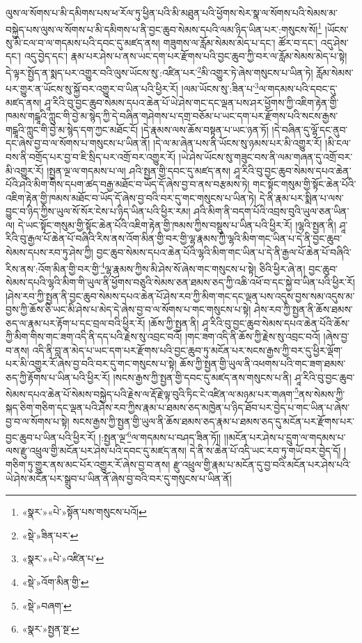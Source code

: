 ལུས་ལ་སོགས་པ་མི་དམིགས་པས་ཕ་རོལ་ཏུ་ཕྱིན་པའི་མི་མཐུན་པའི་ཕྱོགས་སེར་སྣ་ལ་སོགས་པའི་སེམས་མ་བསྐྱེད་པས་ལུས་ལ་སོགས་པ་མི་དམིགས་པ་ནི་བྱང་ཆུབ་སེམས་དཔའི་ལམ་ཉིད་ཡིན་པར་:གསུངས་སོ།\footnote{«སྣར་»«པེ་»སྟོན་པས་གསུངས་པའོ།} །ཡོངས་སུ་མི་ངལ་བ་ལ་གདམས་པའི་དབང་དུ་མཛད་ནས། གཟུགས་ལ་རློམ་སེམས་མེད་པ་དང་། ཚོར་བ་དང་། འདུ་ཤེས་དང་། འདུ་བྱེད་དང་། རྣམ་པར་ཤེས་པ་ནས་ཡང་དག་པར་རྫོགས་པའི་བྱང་ཆུབ་ཀྱི་བར་ལ་རློམ་སེམས་མེད་པ་སྟེ། དེ་ལྟར་སྤྱོད་ན་སྨད་པར་འགྱུར་བའི་ལུས་ཡོངས་སུ་:འཛིན་པར་\footnote{«སྡེ་»ཟིན་པར་}མི་འགྱུར་ཏེ་ཞེས་གསུངས་པ་ཡིན་ཏེ། རློམ་སེམས་པར་གྱུར་ན་ཡོངས་སུ་སྐྱོ་བར་འགྱུར་བ་ཡིན་པའི་ཕྱིར་རོ། །ལམ་ཡོངས་སུ་:ཟིན་པ་\footnote{«སྣར་»«པེ་»འཛིན་པ་}ལ་གདམས་པའི་དབང་དུ་མཛད་ནས། ཤཱ་རིའི་བུ་བྱང་ཆུབ་སེམས་དཔའ་ཆེན་པོ་ཡེ་ཤེས་གང་དང་ལྡན་པས་ཤར་ཕྱོགས་ཀྱི་འཇིག་རྟེན་གྱི་ཁམས་གངྒཱའི་ཀླུང་གི་བྱེ་མ་སྙེད་ཀྱི་དེ་བཞིན་གཤེགས་པ་དགྲ་བཅོམ་པ་ཡང་དག་པར་རྫོགས་པའི་སངས་རྒྱས་གངྒཱའི་ཀླུང་གི་བྱེ་མ་སྙེད་དག་ཀྱང་མཐོང་ངོ། །དེ་རྣམས་ལས་ཆོས་བསྟན་པ་ཡང་ཉན་ཏོ། །དེ་བཞིན་དུ་ལྷོ་དང་ནུབ་དང་ཞེས་བྱ་བ་ལ་སོགས་པ་གསུངས་པ་ཡིན་ནོ། །དེ་ལ་མ་ཞེན་པས་ནི་ཡོངས་སུ་ཉམས་པར་མི་འགྱུར་རོ། །མི་ངལ་བས་ནི་བགྲོད་པར་བྱ་བ་ཇི་སྲིད་པར་འགྲོ་བར་འགྱུར་རོ། །ཡེ་ཤེས་ཡོངས་སུ་གཟུང་བས་ནི་ལམ་གཞན་དུ་འགྲོ་བར་མི་འགྱུར་རོ། །སྤྱན་ལྔ་ལ་གདམས་པ་ལ། ཤའི་སྤྱན་གྱི་དབང་དུ་མཛད་ནས། ཤཱ་རིའི་བུ་བྱང་ཆུབ་སེམས་དཔའ་ཆེན་པོའི་ཤའི་མིག་གིས་དཔག་ཚད་བརྒྱ་མཐོང་བ་ཡོད་དོ་ཞེས་བྱ་བ་ནས་བརྩམས་ཏེ། གང་སྟོང་གསུམ་གྱི་སྟོང་ཆེན་པོའི་འཇིག་རྟེན་གྱི་ཁམས་མཐོང་བ་ཡོད་དོ་ཞེས་བྱ་བའི་བར་དུ་གང་གསུངས་པ་ཡིན་ཏེ། དེ་ནི་རྣམ་པར་སྨིན་པ་ལས་བྱུང་བ་ཉིད་ཀྱིས་ཡུལ་སོ་སོར་ངེས་པ་ཉིད་ཡིན་པའི་ཕྱིར་རམ། ཤའི་མིག་ནི་བདག་པོའི་འབྲས་བུའི་ཡུལ་ཅན་ཡིན་ལ། དེ་ཡང་སྟོང་གསུམ་གྱི་སྟོང་ཆེན་པོའི་འཇིག་རྟེན་གྱི་ཁམས་ཀྱིས་བསྡུས་པ་ཡིན་པའི་ཕྱིར་རོ། །ལྷའི་སྤྱན་ནི། ཤཱ་རིའི་བུ་རྒྱལ་པོ་ཆེན་པོ་བཞིའི་རིས་ནས་འོག་མིན་གྱི་བར་གྱི་ལྷ་རྣམས་ཀྱི་ལྷའི་མིག་གང་ཡིན་པ་དེ་ནི་བྱང་ཆུབ་སེམས་དཔས་རབ་ཏུ་ཤེས་ཀྱི། བྱང་ཆུབ་སེམས་དཔའ་ཆེན་པོའི་ལྷའི་མིག་གང་ཡིན་པ་དེ་ནི་རྒྱལ་པོ་ཆེན་པོ་བཞིའི་རིས་ནས་:འོག་མིན་གྱི་བར་གྱི་\footnote{«སྡེ་»འོག་མིན་གྱི་}ལྷ་རྣམས་ཀྱིས་མི་ཤེས་སོ་ཞེས་གང་གསུངས་པ་སྟེ། ཅིའི་ཕྱིར་ཞེ་ན། བྱང་ཆུབ་སེམས་དཔའི་ལྷའི་མིག་གི་ཡུལ་ནི་ཕྱོགས་བཅུའི་སེམས་ཅན་ཐམས་ཅད་ཀྱི་འཆི་འཕོ་བ་དང་སྐྱེ་བ་ཡིན་པའི་ཕྱིར་རོ། །ཤེས་རབ་ཀྱི་སྤྱན་ནི་བྱང་ཆུབ་སེམས་དཔའ་ཆེན་པོ་ཤེས་རབ་ཀྱི་མིག་གང་དང་ལྡན་པས་འདུས་བྱས་སམ་འདུས་མ་བྱས་ཀྱི་ཆོས་ཅི་ཡང་མི་ཤེས་པ་མེད་དེ་ཞེས་བྱ་བ་ལ་སོགས་པ་གང་གསུངས་པ་སྟེ། ཤེས་རབ་ཀྱི་སྤྱན་ནི་ཆོས་ཐམས་ཅད་ལ་རྣམ་པར་རྟོག་པ་དང་བྲལ་བའི་ཕྱིར་རོ། །ཆོས་ཀྱི་སྤྱན་ནི། ཤཱ་རིའི་བུ་བྱང་ཆུབ་སེམས་དཔའ་ཆེན་པོའི་ཆོས་ཀྱི་མིག་གིས་གང་ཟག་འདི་ནི་དད་པའི་རྗེས་སུ་འབྲང་བའོ། །གང་ཟག་འདི་ནི་ཆོས་ཀྱི་རྗེས་སུ་འབྲང་བའོ། །ཞེས་བྱ་བ་ནས། འདི་ནི་བླ་ན་མེད་པ་ཡང་དག་པར་རྫོགས་པའི་བྱང་ཆུབ་ཏུ་མངོན་པར་སངས་རྒྱས་ཀྱི་བར་དུ་ཕྱིར་ལྡོག་པར་མི་འགྱུར་རོ་ཞེས་བྱ་བའི་བར་དུ་གང་གསུངས་པ་སྟེ། ཆོས་ཀྱི་སྤྱན་གྱི་ཡུལ་ནི་འཕགས་པའི་གང་ཟག་ཐམས་ཅད་ཀྱི་རྟོགས་པ་ཡིན་པའི་ཕྱིར་རོ། །སངས་རྒྱས་ཀྱི་སྤྱན་གྱི་དབང་དུ་མཛད་ནས་གསུངས་པ་ནི། ཤཱ་རིའི་བུ་བྱང་ཆུབ་སེམས་དཔའ་ཆེན་པོ་སེམས་བསྐྱེད་པའི་རྗེས་ལ་རྡོ་རྗེ་ལྟ་བུའི་ཏིང་ངེ་འཛིན་ལ་མཉམ་པར་གཞག་\footnote{«སྡེ་»བཞག་}ནས་སེམས་ཀྱི་སྐད་ཅིག་གཅིག་དང་ལྡན་པའི་ཤེས་རབ་ཀྱིས་རྣམ་པ་ཐམས་ཅད་མཁྱེན་པ་ཉིད་ཐོབ་པར་བྱེད་པ་གང་ཡིན་པ་ཞེས་བྱ་བ་ལ་སོགས་པ་སྟེ། སངས་རྒྱས་ཀྱི་སྤྱན་གྱི་ཡུལ་ནི་ཆོས་ཐམས་ཅད་རྣམ་པ་ཐམས་ཅད་དུ་མངོན་པར་རྫོགས་པར་བྱང་ཆུབ་པ་ཡིན་པའི་ཕྱིར་རོ། །:སྤྱན་ལྔ་\footnote{«སྣར་»སྤྱན་སྔ་}ལ་གདམས་པ་བཤད་ཟིན་ཏོ།། །།མངོན་པར་ཤེས་པ་དྲུག་ལ་གདམས་པ་ལས་རྫུ་འཕྲུལ་གྱི་མངོན་པར་ཤེས་པའི་དབང་དུ་མཛད་ནས། དེ་ནི་ས་ཆེན་པོ་འདི་ཡང་རབ་ཏུ་གཡོ་བར་བྱེད་དོ། །གཅིག་ཏུ་གྱུར་ནས་མང་པོར་འགྱུར་རོ་ཞེས་བྱ་བ་ནས། རྫུ་འཕྲུལ་གྱི་རྣམ་པ་མངོན་དུ་བྱ་བའི་མངོན་པར་ཤེས་པའི་ཡེ་ཤེས་མངོན་པར་སྒྲུབ་པ་ཡིན་ནོ་ཞེས་བྱ་བའི་བར་དུ་གསུངས་པ་ཡིན་ནོ། 